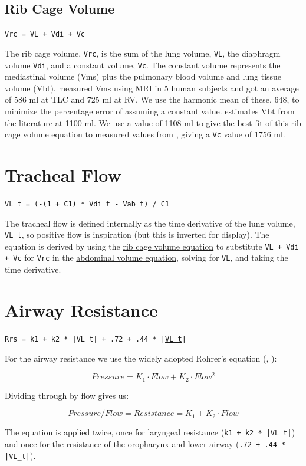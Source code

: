 \documentclass[12pt,openany,oneside]{book}
\newcommand{\ticode}[1]{\texttt{#1}}
\begin{document}
\subsection{Rib Cage Volume}
\ticode{Vrc = VL + Vdi + Vc}

The rib cage volume, \ticode{Vrc}, is the sum of the lung volume,
\ticode{VL}, the diaphragm volume \ticode{Vdi}, and a constant volume,
\ticode{Vc}.  The constant volume represents the mediastinal volume
(Vms) plus the pulmonary blood volume and lung tissue volume (Vbt).
\citet{Cluzel01052000} measured Vms using MRI in 5 human subjects and
got an average of 586 ml at TLC and 725 ml at RV.  We use the harmonic
mean of these, 648, to minimize the percentage error of assuming a
constant value.  \citet{Cluzel01052000} estimates Vbt from the
literature at 1100 ml.  We use a value of 1108 ml to give the best fit
of this rib cage volume equation to measured values from
\citet{Cluzel01052000}, giving a \ticode{Vc} value of 1756 ml.

\section{Tracheal Flow}

\ticode{VL\_t = (-(1 + C1) * Vdi\_t - Vab\_t) / C1}

The tracheal flow is defined internally as the time derivative of the
lung volume, \ticode{VL\_t}, so positive flow is inspiration (but this
is inverted for display).  The equation is derived by using the \hyperref[rib
cage volume]{rib cage volume equation} to substitute \ticode{VL + Vdi + Vc} for
\ticode{Vrc} in the \hyperref[abdominal volume]{abdominal volume equation}, solving for
\ticode{VL}, and taking the time derivative.

\section{Airway Resistance}

\ticode{Rrs = k1 + k2 * |VL\_t| + .72 + .44 * |\hyperlink{VL_t}{VL\_t}|}

For the airway resistance we use the widely adopted Rohrer's equation
(\citet{Hey01091982}, \citet{Rohrer1915}):

\[Pressure = K_1\cdot Flow+K_2\cdot Flow^2\]

Dividing through by flow gives us:

\[Pressure/Flow = Resistance = K_1+K_2\cdot Flow\]

The equation is applied twice, once for laryngeal resistance
(\ticode{k1 + k2 * |VL\_t|}) and once for the resistance of the
oropharynx and lower airway (\ticode{.72 + .44 * |VL\_t|}).
\end{document}
